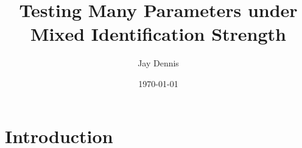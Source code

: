 




\title[Max Test under id Failure] %
{Testing Many Parameters under Mixed Identification Strength 
}
\author[Jay Dennis] %
{Jay Dennis
}
\date[\today] %
{\today}




\begin{frame}[noframenumbering]
\titlepage
\begin{center}
\small
\end{center}
\end{frame}



\section*{Introduction}


%



